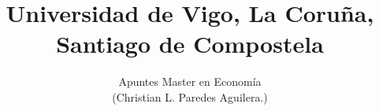 \normalfont

\author{\Large Apuntes Master en Economía \\ \small (Christian L. Paredes Aguilera.)}
\title{\small Universidad de Vigo, La Coruña, Santiago de Compostela}
\date{}
\pagestyle{empty}
\maketitle
\thispagestyle{empty}
\let\cleardoublepage\clearpage
\tableofcontents								%


 
\let\cleardoublepage\clearpage
